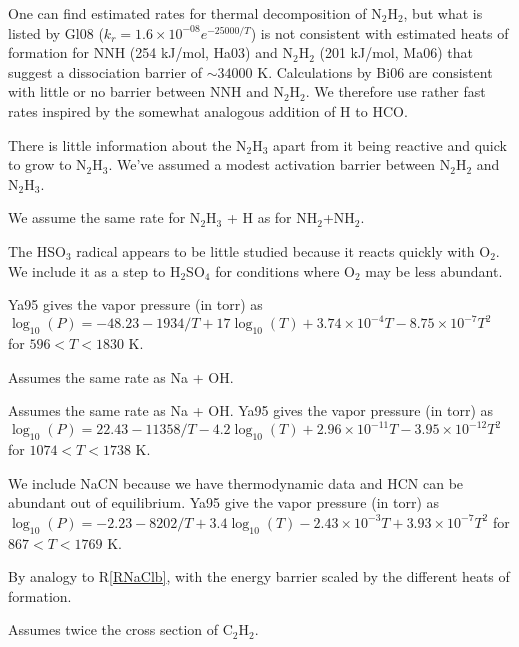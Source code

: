 \documentclass[12pt,landscape]{article}
\begin{document}
 One can find estimated rates for thermal decomposition of N$_2$H$_2$, but what is listed by Gl08
($k_r=1.6\times 10^{-08} e^{-25000/T}$) is not consistent with estimated heats of formation for NNH (254 kJ/mol, Ha03) and N$_2$H$_2$ (201 kJ/mol, Ma06) that suggest a dissociation barrier of $\sim 34000$ K.  Calculations by Bi06 are consistent with little or no barrier between NNH and N$_2$H$_2$.  We therefore use rather fast rates inspired by the somewhat analogous addition of H to HCO.

 There is little information about the N$_2$H$_3$ apart from it being reactive and quick to grow to N$_2$H$_3$.  We've assumed a modest activation barrier between N$_2$H$_2$ and N$_2$H$_3$.

 We assume the same rate for N$_2$H$_3$ + H as for NH$_2$+NH$_2$.

  The HSO$_3$ radical appears to be little studied because it reacts quickly with O$_2$.
We include it as a step to H$_2$SO$_4$ for conditions where O$_2$ may be less abundant.


  Ya95 gives the vapor pressure (in torr) as $\log_{10}{\left(P\right)} =-48.23-1934/T+17\log_{10}{\left(T\right)}+3.74\times 10^{-4}T-8.75\times 10^{-7}T^2$  for $596<T<1830$ K. 

  Assumes the same rate as Na + OH. 

  Assumes the same rate as Na + OH.  Ya95 gives the vapor pressure (in torr) as $\log_{10}{\left(P\right)} = 22.43-11358/T-4.2\log_{10}{\left(T\right)}+2.96\times 10^{-11}T-3.95\times 10^{-12}T^2$ for $1074<T<1738$ K. 

  We include NaCN because we have thermodynamic data and HCN can be abundant out of equilibrium. Ya95 give the vapor pressure (in torr) as $\log_{10}{\left(P\right)} =-2.23-8202/T+3.4\log_{10}{\left(T\right)}-2.43\times 10^{-3}T+3.93\times 10^{-7}T^2$ for $867<T<1769$ K.

  By analogy to R\ref{RNaClb}, with the energy barrier scaled by the different heats of formation.



\medskip
{}  Assumes twice the cross section of C$_2$H$_2$.
\end{document}
